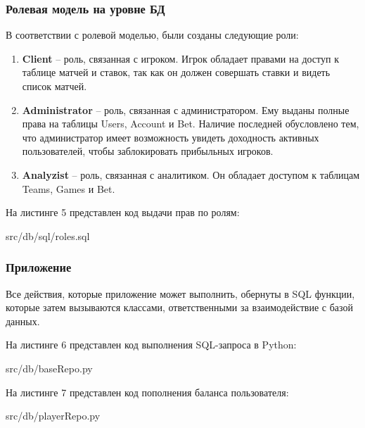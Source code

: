 \newpage
\subsubsection{Ролевая модель на уровне БД}
В соответствии с ролевой моделью, были созданы следующие роли:
\begin{enumerate}
	\item \textbf{Client} -- роль, связанная с игроком. Игрок обладает правами на доступ к таблице матчей и ставок, так как он должен совершать ставки и видеть список матчей.
	\item \textbf{Administrator} -- роль, связанная с администратором. Ему выданы полные права на таблицы Users, Account и Bet. Наличие последней обусловлено тем, что администратор имеет возможность увидеть доходность активных пользователей, чтобы заблокировать прибыльных игроков.
	\item \textbf{Analyzist} -- роль, связанная с аналитиком. Он обладает доступом к таблицам Teams, Games и Bet.
\end{enumerate}

На листинге 5 представлен код выдачи прав по ролям:
\FloatBarrier
\begin{lstinputlisting}[language=SQL, caption=Выдача прав ролям, 
	basicstyle=\footnotesize\ttfamily, frame=single,breaklines=true]{src/db/sql/roles.sql}
\end{lstinputlisting}
\FloatBarrier

\newpage
\subsubsection{Приложение}
Все действия, которые приложение может выполнить, обернуты в SQL функции, которые затем вызываются классами, ответственными за взаимодействие с базой данных.

На листинге 6 представлен код выполнения SQL-запроса в Python:
\FloatBarrier
\begin{lstinputlisting}[language=Python, caption=Выполнение SQL-запроса, linerange = {11-28},
	basicstyle=\footnotesize\ttfamily, frame=single,breaklines=true]{src/db/baseRepo.py}
\end{lstinputlisting}
\FloatBarrier

На листинге 7 представлен код пополнения баланса пользователя:
\FloatBarrier
\begin{lstinputlisting}[language=Python, caption=Пополнение баланса пользователя, linerange = {44-47},
	basicstyle=\footnotesize\ttfamily, frame=single,breaklines=true]{src/db/playerRepo.py}
\end{lstinputlisting}
\FloatBarrier

